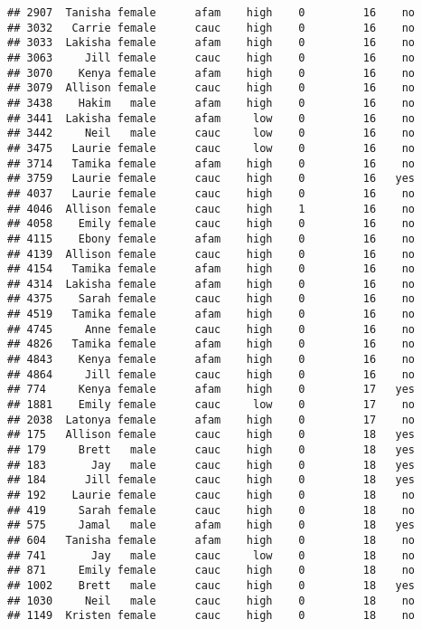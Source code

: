\documentclass[
]{article}
\begin{document}
\begin{verbatim}
## 2907  Tanisha female      afam    high    0         16    no
## 3032   Carrie female      cauc    high    0         16    no
## 3033  Lakisha female      afam    high    0         16    no
## 3063     Jill female      cauc    high    0         16    no
## 3070    Kenya female      afam    high    0         16    no
## 3079  Allison female      cauc    high    0         16    no
## 3438    Hakim   male      afam    high    0         16    no
## 3441  Lakisha female      afam     low    0         16    no
## 3442     Neil   male      cauc     low    0         16    no
## 3475   Laurie female      cauc     low    0         16    no
## 3714   Tamika female      afam    high    0         16    no
## 3759   Laurie female      cauc    high    0         16   yes
## 4037   Laurie female      cauc    high    0         16    no
## 4046  Allison female      cauc    high    1         16    no
## 4058    Emily female      cauc    high    0         16    no
## 4115    Ebony female      afam    high    0         16    no
## 4139  Allison female      cauc    high    0         16    no
## 4154   Tamika female      afam    high    0         16    no
## 4314  Lakisha female      afam    high    0         16    no
## 4375    Sarah female      cauc    high    0         16    no
## 4519   Tamika female      afam    high    0         16    no
## 4745     Anne female      cauc    high    0         16    no
## 4826   Tamika female      afam    high    0         16    no
## 4843    Kenya female      afam    high    0         16    no
## 4864     Jill female      cauc    high    0         16    no
## 774     Kenya female      afam    high    0         17   yes
## 1881    Emily female      cauc     low    0         17    no
## 2038  Latonya female      afam    high    0         17    no
## 175   Allison female      cauc    high    0         18   yes
## 179     Brett   male      cauc    high    0         18   yes
## 183       Jay   male      cauc    high    0         18   yes
## 184      Jill female      cauc    high    0         18   yes
## 192    Laurie female      cauc    high    0         18    no
## 419     Sarah female      cauc    high    0         18    no
## 575     Jamal   male      afam    high    0         18   yes
## 604   Tanisha female      afam    high    0         18    no
## 741       Jay   male      cauc     low    0         18    no
## 871     Emily female      cauc    high    0         18    no
## 1002    Brett   male      cauc    high    0         18   yes
## 1030     Neil   male      cauc    high    0         18    no
## 1149  Kristen female      cauc    high    0         18    no

\end{verbatim}
\end{document}
